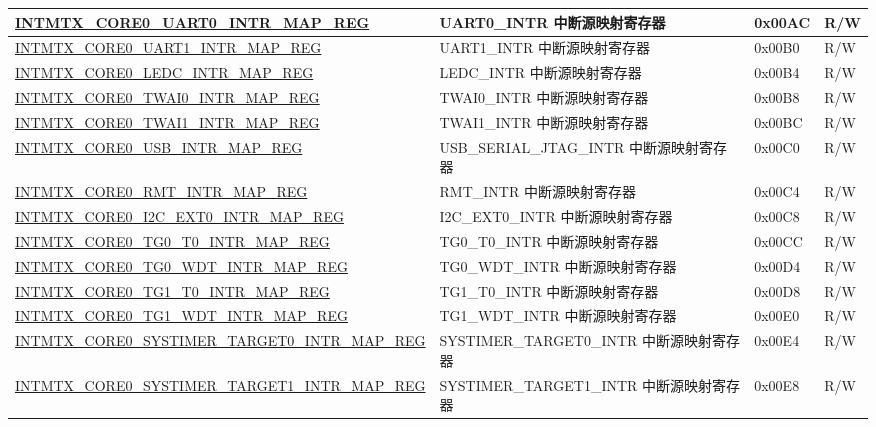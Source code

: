 \begin{longtable}{ | p{10cm} | m{10cm} | m{1.3cm} | m{1.0cm} | }
\hyperref[regdesc:INTMTXCORE0UART0INTRMAPREG]{INTMTX\_CORE0\_UART0\_INTR\_MAP\_REG} & UART0\_INTR 中断源映射寄存器 & 0x00AC & R/W \\ \hline
\hyperref[regdesc:INTMTXCORE0UART1INTRMAPREG]{INTMTX\_CORE0\_UART1\_INTR\_MAP\_REG} & UART1\_INTR 中断源映射寄存器 & 0x00B0 & R/W \\ \hline
\hyperref[regdesc:INTMTXCORE0LEDCINTRMAPREG]{INTMTX\_CORE0\_LEDC\_INTR\_MAP\_REG} & LEDC\_INTR 中断源映射寄存器 & 0x00B4 & R/W \\ \hline
\hyperref[regdesc:INTMTXCORE0TWAI0INTRMAPREG]{INTMTX\_CORE0\_TWAI0\_INTR\_MAP\_REG} & TWAI0\_INTR 中断源映射寄存器 & 0x00B8 & R/W \\ \hline
\hyperref[regdesc:INTMTXCORE0TWAI1INTRMAPREG]{INTMTX\_CORE0\_TWAI1\_INTR\_MAP\_REG} & TWAI1\_INTR 中断源映射寄存器 & 0x00BC & R/W \\ \hline
\hyperref[regdesc:INTMTXCORE0USBINTRMAPREG]{INTMTX\_CORE0\_USB\_INTR\_MAP\_REG} & USB\_SERIAL\_JTAG\_INTR 中断源映射寄存器 & 0x00C0 & R/W \\ \hline
\hyperref[regdesc:INTMTXCORE0RMTINTRMAPREG]{INTMTX\_CORE0\_RMT\_INTR\_MAP\_REG} & RMT\_INTR 中断源映射寄存器 & 0x00C4 & R/W \\ \hline
\hyperref[regdesc:INTMTXCORE0I2CEXT0INTRMAPREG]{INTMTX\_CORE0\_I2C\_EXT0\_INTR\_MAP\_REG} & I2C\_EXT0\_INTR 中断源映射寄存器 & 0x00C8 & R/W \\ \hline
\hyperref[regdesc:INTMTXCORE0TG0T0INTRMAPREG]{INTMTX\_CORE0\_TG0\_T0\_INTR\_MAP\_REG} & TG0\_T0\_INTR 中断源映射寄存器 & 0x00CC & R/W \\ \hline
\hyperref[regdesc:INTMTXCORE0TG0WDTINTRMAPREG]{INTMTX\_CORE0\_TG0\_WDT\_INTR\_MAP\_REG} & TG0\_WDT\_INTR 中断源映射寄存器 & 0x00D4 & R/W \\ \hline
\hyperref[regdesc:INTMTXCORE0TG1T0INTRMAPREG]{INTMTX\_CORE0\_TG1\_T0\_INTR\_MAP\_REG} & TG1\_T0\_INTR 中断源映射寄存器 & 0x00D8 & R/W \\ \hline
\hyperref[regdesc:INTMTXCORE0TG1WDTINTRMAPREG]{INTMTX\_CORE0\_TG1\_WDT\_INTR\_MAP\_REG} & TG1\_WDT\_INTR 中断源映射寄存器 & 0x00E0 & R/W \\ \hline
\hyperref[regdesc:INTMTXCORE0SYSTIMERTARGET0INTRMAPREG]{INTMTX\_CORE0\_SYSTIMER\_TARGET0\_INTR\_MAP\_REG} & SYSTIMER\_TARGET0\_INTR 中断源映射寄存器 & 0x00E4 & R/W \\ \hline
\hyperref[regdesc:INTMTXCORE0SYSTIMERTARGET1INTRMAPREG]{INTMTX\_CORE0\_SYSTIMER\_TARGET1\_INTR\_MAP\_REG} & SYSTIMER\_TARGET1\_INTR 中断源映射寄存器 & 0x00E8 & R/W \\ \hline

\end{longtable}
